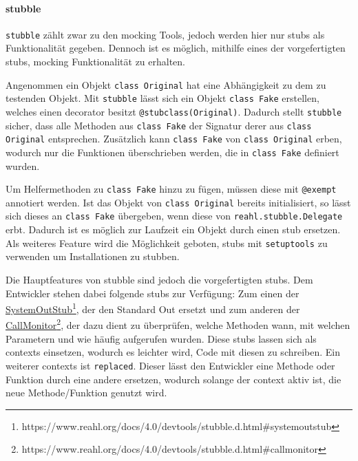 \paragraph{stubble}\label{python-tools:stubble}\mbox{}
\newline
\lstinline{stubble} zählt zwar zu den \gls{mock}ing Tools, jedoch werden hier
nur \Glspl{stub} als Funktionalität gegeben. Dennoch ist es möglich, mithilfe 
eines der vorgefertigten \Glspl{stub}, \gls{mock}ing Funktionalität zu erhalten.
\newline

Angenommen ein Objekt \lstinline{class Original} hat eine Abhängigkeit zu dem zu
testenden Objekt. Mit \lstinline{stubble} lässt sich ein Objekt
\lstinline{class Fake} erstellen, welches einen \gls{decorator} besitzt
\lstinline{@stubclass(Original)}. Dadurch stellt \lstinline{stubble} sicher,
dass alle Methoden aus \lstinline{class Fake} der Signatur derer aus
\lstinline{class Original} entsprechen. Zusätzlich kann \lstinline{class Fake}
von \lstinline{class Original} erben, wodurch nur die Funktionen überschrieben
werden, die in \lstinline{class Fake} definiert wurden.

Um Helfermethoden zu \lstinline{class Fake} hinzu zu fügen, müssen diese mit
\lstinline{@exempt} annotiert werden. Ist das Objekt von
\lstinline{class Original} bereits initialisiert, so lässt sich dieses an
\lstinline{class Fake} übergeben, wenn diese von 
\lstinline{reahl.stubble.Delegate} erbt. Dadurch ist es möglich zur Laufzeit
ein Objekt durch einen \Gls{stub} ersetzen. Als weiteres Feature wird die
Möglichkeit geboten, \Glspl{stub} mit \lstinline{setuptools} zu verwenden um
Installationen zu \gls{stub}ben.

Die Hauptfeatures von stubble sind jedoch die vorgefertigten \Glspl{stub}. Dem 
Entwickler stehen dabei folgende \Glspl{stub} zur Verfügung:
Zum einen der
\href{https://www.reahl.org/docs/4.0/devtools/stubble.d.html\#systemoutstub}{SystemOutStub}\footnote{https://www.reahl.org/docs/4.0/devtools/stubble.d.html\#systemoutstub},
der den Standard Out ersetzt und zum anderen der
\href{https://www.reahl.org/docs/4.0/devtools/stubble.d.html\#callmonitor}{CallMonitor}\footnote{https://www.reahl.org/docs/4.0/devtools/stubble.d.html\#callmonitor},
der dazu dient zu überprüfen, welche Methoden wann, mit welchen Parametern und
wie häufig aufgerufen wurden.
Diese \Glspl{stub} lassen sich als \Glspl{context} einsetzen, wodurch es
leichter wird, Code mit diesen zu schreiben. Ein weiterer \Glspl{context} ist
\lstinline{replaced}. Dieser lässt den Entwickler eine Methode oder Funktion
durch eine andere ersetzen, wodurch solange der \Gls{context} aktiv ist, die
neue Methode/Funktion genutzt wird.

